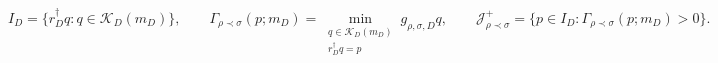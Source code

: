 \[I_D=\{r_D^\dagger q:q\in\mathcal K_D(m_D)\},\qquad\Gamma_{\rho\prec\sigma}(p;m_D)=\min_{\substack{q\in\mathcal K_D(m_D)\\ r_D^\dagger q=p}}g_{\rho,\sigma,D}q,\qquad\mathcal J_{\rho\prec\sigma}^+=\{p\in I_D:\Gamma_{\rho\prec\sigma}(p;m_D)>0\}.\]